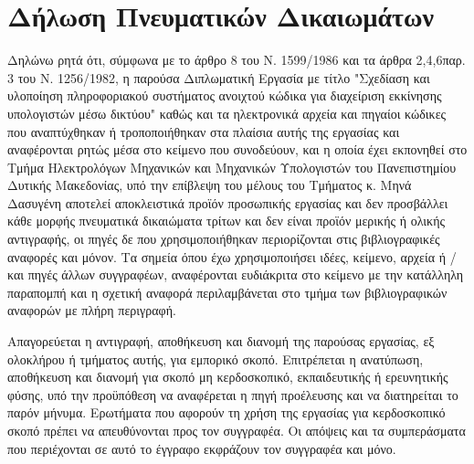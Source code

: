\chapter*{Δήλωση Πνευματικών Δικαιωμάτων}
Δηλώνω ρητά ότι, σύμφωνα με το άρθρο 8 του Ν. 1599/1986 και τα άρθρα 2,4,6παρ. 3 του Ν. 1256/1982, η παρούσα Διπλωματική Εργασία με τίτλο "Σχεδίαση και υλοποίηση πληροφοριακού συστήματος ανοιχτού κώδικα για διαχείριση εκκίνησης υπολογιστών μέσω δικτύου" καθώς και τα ηλεκτρονικά αρχεία και πηγαίοι κώδικες που αναπτύχθηκαν ή τροποποιήθηκαν στα πλαίσια αυτής της εργασίας και αναφέρονται ρητώς μέσα στο κείμενο που συνοδεύουν, και η οποία έχει εκπονηθεί στο Τμήμα Ηλεκτρολόγων Μηχανικών και Μηχανικών Υπολογιστών του Πανεπιστημίου Δυτικής Μακεδονίας, υπό την επίβλεψη του μέλους του Τμήματος κ. Μηνά Δασυγένη αποτελεί αποκλειστικά προϊόν προσωπικής εργασίας και δεν προσβάλλει κάθε μορφής πνευματικά δικαιώματα τρίτων και δεν είναι προϊόν μερικής ή ολικής αντιγραφής, οι πηγές δε που χρησιμοποιήθηκαν περιορίζονται στις βιβλιογραφικές αναφορές και μόνον. Τα σημεία όπου έχω χρησιμοποιήσει ιδέες, κείμενο, αρχεία ή / και πηγές άλλων συγγραφέων, αναφέρονται ευδιάκριτα στο κείμενο με την κατάλληλη παραπομπή και η σχετική αναφορά περιλαμβάνεται στο τμήμα των βιβλιογραφικών αναφορών με πλήρη περιγραφή.

Απαγορεύεται η αντιγραφή, αποθήκευση και διανομή της παρούσας εργασίας, εξ ολοκλήρου ή τμήματος αυτής, για εμπορικό σκοπό. Επιτρέπεται η ανατύπωση, αποθήκευση και διανομή για σκοπό μη κερδοσκοπικό, εκπαιδευτικής ή ερευνητικής φύσης, υπό την προϋπόθεση να αναφέρεται η πηγή προέλευσης και να διατηρείται το παρόν μήνυμα. Ερωτήματα που αφορούν τη
χρήση της εργασίας για κερδοσκοπικό σκοπό πρέπει να απευθύνονται προς τον συγγραφέα. Οι απόψεις και τα συμπεράσματα που περιέχονται σε αυτό το έγγραφο εκφράζουν τον συγγραφέα και μόνο.

\vfill

\begin{center}
\end{center}
